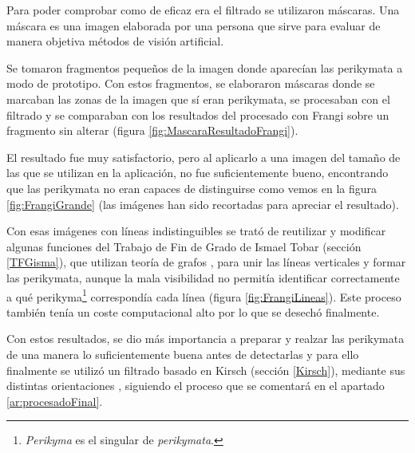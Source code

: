 Para poder comprobar como de eficaz era el filtrado se utilizaron máscaras. Una máscara es una imagen elaborada por una persona que sirve para evaluar de manera objetiva métodos de visión artificial.

Se tomaron fragmentos pequeños de la imagen donde aparecían las perikymata a modo de prototipo. Con estos fragmentos, se elaboraron máscaras donde se marcaban las zonas de la imagen que sí eran perikymata, se procesaban con el filtrado y se comparaban con los resultados del procesado con Frangi sobre un fragmento sin alterar (figura \ref{fig:MascaraResultadoFrangi}).


El resultado fue muy satisfactorio, pero al aplicarlo a una imagen del tamaño de las que se utilizan en la aplicación, no fue suficientemente bueno, encontrando que las perikymata no eran capaces de distinguirse como vemos en la figura \ref{fig:FrangiGrande} (las imágenes han sido recortadas para apreciar el resultado). 


Con esas imágenes con líneas indistinguibles se trató de reutilizar y modificar algunas funciones del Trabajo de Fin de Grado de Ismael Tobar (sección \ref{TFGisma}), que utilizan teoría de grafos \cite{wiki:TeoriaGrafos}, para unir las líneas verticales y formar las perikymata, aunque la mala visibilidad no permitía identificar correctamente a qué perikyma\footnote{\textit{Perikyma} es el singular de \textit{perikymata}.} correspondía cada línea (figura \ref{fig:FrangiLineas}). Este proceso también tenía un coste computacional alto por lo que se desechó finalmente.


Con estos resultados, se dio más importancia a preparar y realzar las perikymata de una manera lo suficientemente buena antes de detectarlas y para ello finalmente se utilizó un filtrado basado en Kirsch (sección \ref{Kirsch}), mediante sus distintas orientaciones \cite{scholar:venmathi2016kirsch}, siguiendo el proceso que se comentará en el apartado \ref{ar:procesadoFinal}.

